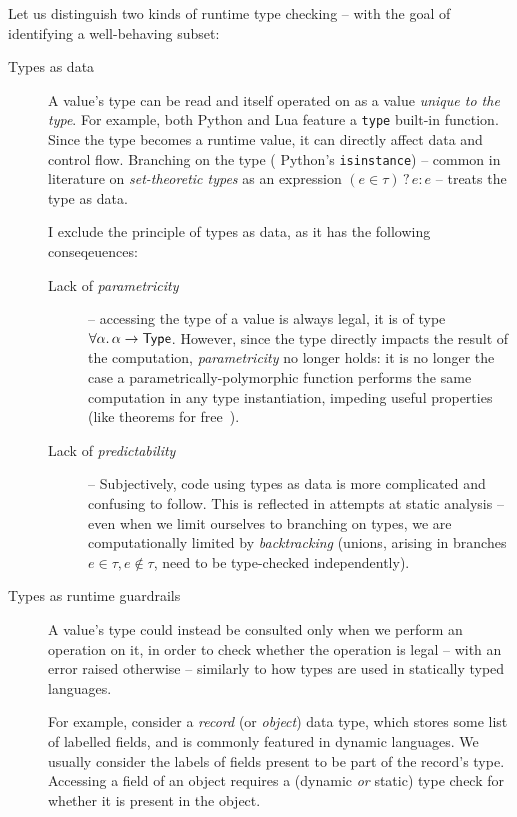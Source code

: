 Let us distinguish two kinds of runtime type checking -- with the goal of identifying a well-behaving subset: \begin{description}
    \item[Types as data] A value's type can be read and itself operated on as a value \emph{unique to the type}. For example, both Python and Lua feature a \texttt{type} built-in function. Since the type becomes a runtime value, it can directly affect data and control flow. 
    Branching on the type (\eg{} Python's \texttt{isinstance}) -- common in literature on \emph{set-theoretic types} as an expression $(e \in \tau) \mathop{?} e \mathop{:} e$ \cite{castagna-dynamic} -- treats the type as data. 
    
    I exclude the principle of types as data, as it has the following conseqeuences: \begin{description}
        \item[Lack of \emph{parametricity}] -- accessing the type of a value is always legal, \ie{} it is of type $\forall \alpha \ldotp \alpha \to \textsf{Type}$. However, since the type directly impacts the result of the computation, \emph{parametricity} no longer holds: it is no longer the case a parametrically-polymorphic function performs the same computation in any type instantiation, impeding useful properties (like theorems for free~\cite{theorems-for-free}).
        \item[Lack of \emph{predictability}] -- Subjectively, code using types as data is more complicated and confusing to follow. This is reflected in attempts at static analysis -- even when we limit ourselves to branching on types, we are computationally limited by \emph{backtracking} \cite{polymorphic-set-theoretic-types, castagna-dynamic, mlstruct} (unions, arising in branches $e \in \tau, e \notin \tau$, need to be type-checked independently).
    \end{description}
    \item[Types as runtime guardrails] A value's type could instead be consulted only when we perform an operation on it, in order to check whether the operation is legal -- with an error raised otherwise -- similarly to how types are used in statically typed languages.     
    
    For example, consider a \emph{record} (or \emph{object}) data type, which stores some list of labelled fields, and is commonly featured in dynamic languages. 
    We usually consider the labels of fields present to be part of the record's type.
    Accessing a field of an object requires a (dynamic \emph{or} static) type check for whether it is present in the object.
    

\end{description}
